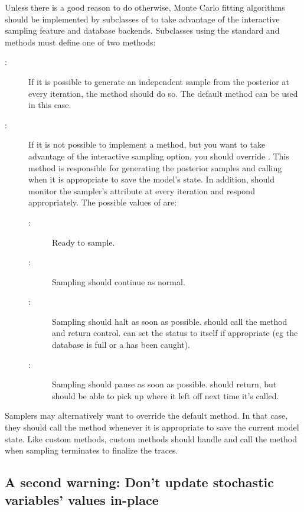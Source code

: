\documentclass[]{jss}
\begin{document}
Unless there is a good reason to do otherwise, Monte Carlo fitting algorithms should be implemented by subclasses of  to take advantage of the interactive sampling feature and database backends. Subclasses using the standard  and  methods must define one of two methods:
\begin{description}
   \item[:] If it is possible to generate an independent sample from the posterior at every iteration, the  method should do so. The default  method can be used in this case.
   \item[:] If it is not possible to implement a  method, but you want to take advantage of the interactive sampling option, you should override . This method is responsible for generating the posterior samples and calling  when it is appropriate to save the model's state. In addition,  should monitor the sampler's  attribute at every iteration and respond appropriately. The possible values of  are:
   \begin{description}
      \item[:] Ready to sample.
      \item[:] Sampling should continue as normal.
      \item[:] Sampling should halt as soon as possible.  should call the  method and return control.  can set the status to  itself if appropriate (eg the database is full or a  has been caught).
      \item[:] Sampling should pause as soon as possible.  should return, but should be able to pick up where it left off next time it's called.
   \end{description}
\end{description}

Samplers may alternatively want to override the default  method. In that case, they should call the  method whenever it is appropriate to save the current model state. Like custom  methods, custom  methods should handle  and call the  method when sampling terminates to finalize the traces.


\subsection{A second warning: Don't update stochastic variables' values in-place}
\label{dont-update-indepth}
\end{document}
